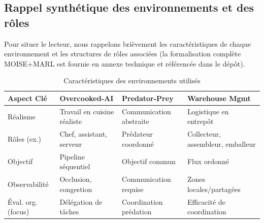 \subsection{Rappel synthétique des environnements et des rôles}
\label{subsec:non_cyber_env_recap}
Pour situer le lecteur, nous rappelons brièvement les caractéristiques de chaque environnement et les structures de rôles associées (la formalisation complète MOISE+MARL est fournie en annexe technique et référencée dans le dépôt).
\begin{table}[h!]
  \centering
  \begin{footnotesize}
    \renewcommand{\arraystretch}{1.3}
    {%

      \footnotesize

      \begin{tabular}{p{2.1cm}p{2.4cm}p{2.4cm}p{2.4cm}}
        \hline
        \textbf{Aspect Clé} & \textbf{Overcooked-AI}      & \textbf{Predator-Prey}  & \textbf{Warehouse Mgmt}           \\ \hline
        Réalisme            & Travail en cuisine réaliste & Communication abstraite & Logistique en entrepôt            \\ \hline
        Rôles (ex.)         & Chef, assistant, serveur    & Prédateur coordonné     & Collecteur, assembleur, emballeur \\ \hline
        Objectif            & Pipeline séquentiel         & Objectif commun         & Flux ordonné                      \\ \hline
        Observabilité       & Occlusion, congestion       & Communication requise   & Zones locales/partagées           \\ \hline
        Éval. org. (focus)  & Délégation de tâches        & Coordination prédation  & Efficacité de coordination        \\ \hline
      \end{tabular}
    }
    \caption{Caractéristiques des environnements utilisés}
    \label{tab:mamad_env_characteristics}
  \end{footnotesize}
\end{table}

